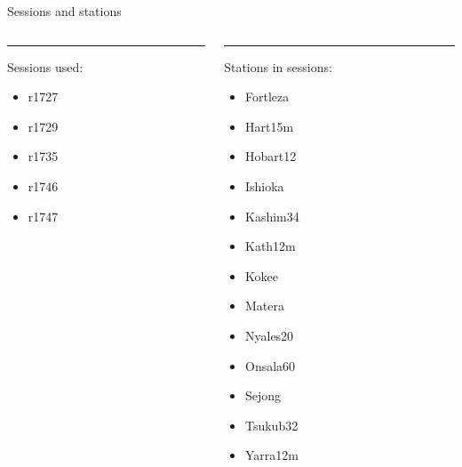 \documentclass{beamer}
\begin{document}
    \begin{frame}{Sessions and stations}
        \begin{columns}[T] %
            \begin{column}{.48\textwidth}
            \color{black}\rule{\linewidth}{4pt}
                Sessions used:
                \begin{itemize}
                    \item r1727
                    \item r1729
                    \item r1735
                    \item r1746
                    \item r1747
                \end{itemize}

        \end{column}
        \hfill
        \begin{column}{.48\textwidth}
           \rule{\linewidth}{4pt}
                Stations in sessions:
                \begin{itemize}
                    \item Fortleza
                    \item Hart15m
                    \item Hobart12
                    \item Ishioka
                    \item Kashim34
                    \item Kath12m
                    \item Kokee
                    \item Matera
                    \item Nyales20
                    \item Onsala60
                    \item Sejong
                    \item Tsukub32
                    \item Yarra12m
                \end{itemize}

        \end{column}%
    \end{columns}
    \end{frame}
\end{document}
